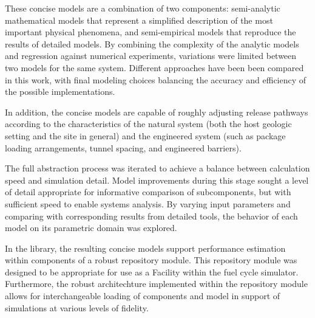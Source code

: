 
These concise models are a combination of two components: 
semi-analytic mathematical models that represent a simplified description of 
the most important physical phenomena, and semi-empirical models that reproduce 
the results of detailed models.  By combining the complexity of the analytic 
models and regression against numerical experiments, variations were limited 
between two models for the same system.  Different approaches have been been 
compared in this work, with final modeling choices balancing the accuracy and 
efficiency of the possible implementations.  

In addition, the concise models are capable of roughly adjusting release 
pathways according to the characteristics of the natural system (both the host 
geologic setting and the site in general) and the engineered system (such as package 
loading arrangements, tunnel spacing, and engineered barriers).

The full abstraction process was iterated to achieve a balance between 
calculation speed and simulation detail. Model improvements during this stage 
sought a level of detail appropriate for informative comparison of subcomponents, but 
with sufficient speed to enable systems analysis. 
By varying input parameters and comparing with corresponding results from 
detailed tools, the behavior of each model on its parametric domain was 
explored.

In the \Cyder library, the resulting concise models support performance estimation 
within components of a robust repository module. This repository module was 
designed to be appropriate for use as a Facility within the \Cyclus fuel cycle 
simulator. Furthermore, the robust architechture implemented within the 
repository module allows for interchangeable loading of components and model in 
support of simulations at various levels of fidelity.




%


